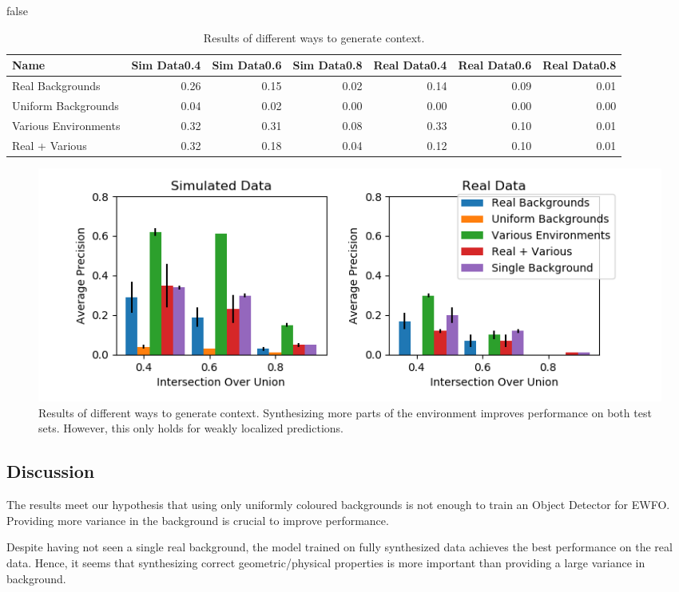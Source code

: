 \if false
\begin{table}[htbp]
	\caption{Results of different ways to generate context.}
\begin{tabular}{lrrrrrr}
	\hline
	Name &  Sim Data0.4 &  Sim Data0.6 &  Sim Data0.8 &  Real Data0.4 &  Real Data0.6 &  Real Data0.8 \\
	\hline
      Real Backgrounds &         0.26 &         0.15 &         0.02 &          0.14 &          0.09 &          0.01 \\
  Uniform Backgrounds &         0.04 &         0.02 &         0.00 &          0.00 &          0.00 &          0.00 \\
  Various Environments &         0.32 &         0.31 &         0.08 &          0.33 &          0.10 &          0.01 \\
        Real + Various &         0.32 &         0.18 &         0.04 &          0.12 &          0.10 &          0.01 \\
\hline
\end{tabular}
	\label{tab:context}
\end{table}
\fi
\begin{figure}[htbp]
	\includegraphics[width=\textwidth]{fig/context_bar}
	\caption{Results of different ways to generate context. Synthesizing more parts of the environment improves performance on both test sets. However, this only holds for weakly localized predictions.}
	\label{fig:context}
\end{figure}

\subsection{Discussion}

The results meet our hypothesis that using only uniformly coloured backgrounds is not enough to train an Object Detector for \ac{EWFO}. Providing more variance in the background is crucial to improve performance.

Despite having not seen a single real background, the model trained on fully synthesized data achieves the best performance on the real data. Hence, it seems that synthesizing correct geometric/physical properties is more important than providing a large variance in background.

